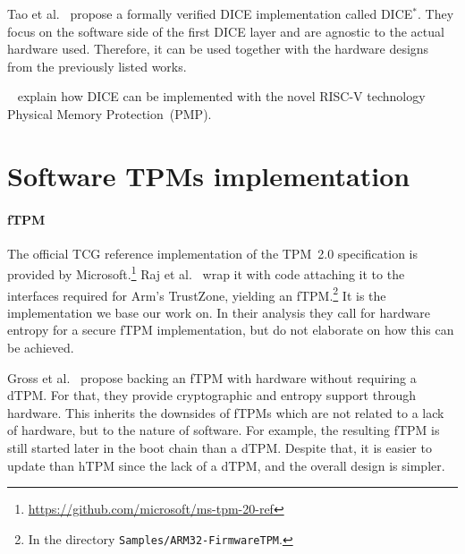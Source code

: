 Tao et al.~\cite{272306} propose a formally verified \ac{DICE} implementation called DICE\( ^* \).
They focus on the software side of the first DICE layer and are agnostic to the actual hardware used.
Therefore, it can be used together with the hardware designs from the previously listed works.

~\cite{Bravi2023} explain how DICE can be implemented with the novel RISC-V technology Physical Memory Protection~(PMP).

\section{Software \acsp{TPM} implementation}



\paragraph{\Acl{fTPM}}

The official \ac{TCG} reference implementation of the TPM~2.0 specification is provided by Microsoft.\footnote{\url{https://github.com/microsoft/ms-tpm-20-ref}}
Raj et al.~\cite{Raj2015} wrap it with code attaching it to the interfaces required for Arm's TrustZone, yielding an \ac{fTPM}.\footnote{In the directory \texttt{Samples/ARM32-FirmwareTPM}.}
It is the implementation we base our work on.
In their analysis they call for hardware entropy for a secure \ac{fTPM} implementation, but do not elaborate on how this can be achieved.

Gross et al.~\cite{Gross2021} propose backing an \ac{fTPM} with hardware without requiring a \ac{dTPM}.
For that, they provide cryptographic and entropy support through hardware.
This inherits the downsides of \acp{fTPM} which are not related to a lack of hardware, but to the nature of software.
For example, the resulting \ac{fTPM} is still started later in the boot chain than a \ac{dTPM}\@.
Despite that, it is easier to update than hTPM since the lack of a dTPM, and the overall design is simpler.

